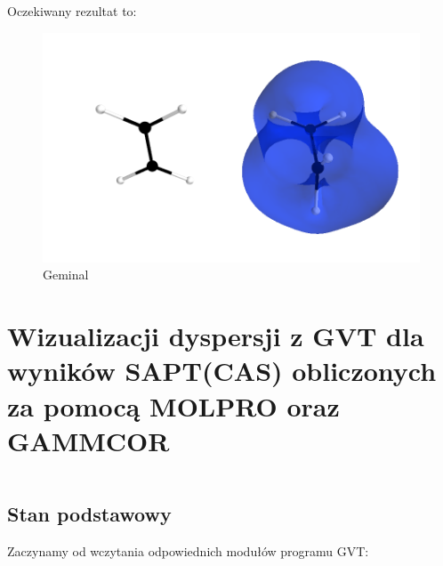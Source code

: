 \documentclass[11pt]{article}
\makeatletter
\newcommand{\boxspacing}{\kern\kvtcb@left@rule\kern\kvtcb@boxsep}
\newcommand{\prompt}[4]{
        {\ttfamily\llap{{\color{#2}[#3]:\hspace{3pt}#4}}\vspace{-\baselineskip}}
    }
\makeatother
\begin{document}
    Oczekiwany rezultat to:

\begin{figure}
\centering
\includegraphics{Examples/C2H4_C2H4/Geminal_etylen.png}
\caption{Geminal}
\end{figure}

    \hypertarget{wizualizacji-dyspersji-z-gvt-dla-wynikuxf3w-saptcas-obliczonych-za-pomocux105-molpro-oraz-gammcor}{%
\section{Wizualizacji dyspersji z GVT dla wyników SAPT(CAS) obliczonych
za pomocą MOLPRO oraz
GAMMCOR}\label{wizualizacji-dyspersji-z-gvt-dla-wynikuxf3w-saptcas-obliczonych-za-pomocux105-molpro-oraz-gammcor}}

    \begin{tcolorbox}[breakable, size=fbox, boxrule=1pt, pad at break*=1mm,colback=cellbackground, colframe=cellborder]
\prompt{In}{incolor}{ }{\boxspacing}
\begin{Verbatim}[commandchars=\\\{\}]

\end{Verbatim}
\end{tcolorbox}

    \hypertarget{stan-podstawowy}{%
\subsection{Stan podstawowy}\label{stan-podstawowy}}

    Zaczynamy od wczytania odpowiednich modułów programu GVT:
\end{document}
